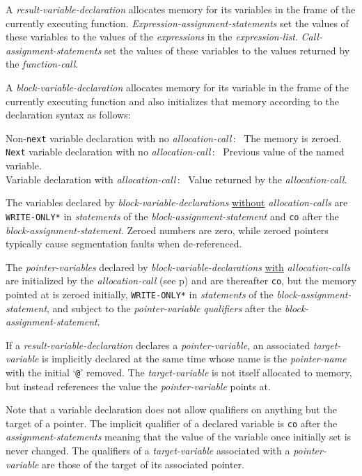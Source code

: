 \documentclass[12pt]{article}
\newcommand{\pagref}[1]{p\pageref{#1}}
\newcommand{\EOL}{\penalty \exhyphenpenalty}
\newenvironment{indpar}[1][0.3in]%
	{\begin{list}{}%
		     {\setlength{\itemsep}{0in}%
		      \setlength{\topsep}{0in}%
		      \setlength{\parsep}{1ex}%
		      \setlength{\labelwidth}{#1}%
		      \setlength{\leftmargin}{#1}%
		      \addtolength{\leftmargin}{\labelsep}}%
	 \item}%
	{\end{list}}
\begin{document}
A {\em result-variable-declaration} allocates memory for its variables
in the frame of the currently executing function.
{\em Expression-assignment-statements} set the values of these variables
to the values of the {\em expressions} in the {\em expression-list}.
{\em Call-assignment-statements} set the values of these variables
to the values returned by the {\em function-call}.

A {\em block-variable-declaration}
allocates memory for its variable
in the frame of the currently executing function and also initializes
that memory according to the declaration syntax as follows:
\begin{indpar}[0.05in]
Non-{\tt next} variable declaration with no {\em allocation-call}\,:~
The memory is zeroed. \\
{\tt Next} variable declaration with no {\em allocation-call}\,:~
Previous value of the named variable. \\
Variable declaration with {\em allocation-call}\,:~
Value returned by the {\em allocation-call}.
\end{indpar}

The variables declared by {\em block-variable-declarations}
\underline{without} {\em allocation-calls}
are {\tt *WRITE-\EOL ONLY*} in {\em statements}
of the {\em block-assignment-statement} and {\tt co} after the
{\em block-assignment-statement}.
Zeroed numbers are zero, while zeroed pointers typically
cause segmentation faults when de-referenced.

The {\em pointer-variables} declared by {\em block-variable-declarations}
\underline{with} {\em allocation-calls}
are initialized by the {\em allocation-call}
(see \pagref{ALLOCATION-CALL}) and are thereafter
{\tt co}, but the memory
pointed at is zeroed initially, 
{\tt *WRITE-\EOL ONLY*} in {\em statements}
of the {\em block-assignment-statement}, and 
subject to the {\em pointer-variable} {\em qualifiers} after
the {\em block-assignment-statement}.

If a {\em result-variable-declaration} declares a {\em pointer-variable},
an associated {\em target-variable} is implicitly declared at the same time
whose name is the {\em pointer-name} with the initial `{\tt @}' removed.
The {\em target-variable} is not itself allocated to memory,
but instead references the value the {\em pointer-variable}
points at.

Note that a variable declaration does not allow
qualifiers on anything but the target of a pointer.  The implicit
qualifier of a declared variable is {\tt co} after the
{\em assignment-statements} meaning that
the value of the variable once initially set is never changed.
The qualifiers of a {\em target-variable} associated with a
{\em pointer-variable} are those of the target of
its associated pointer.
\end{document}
